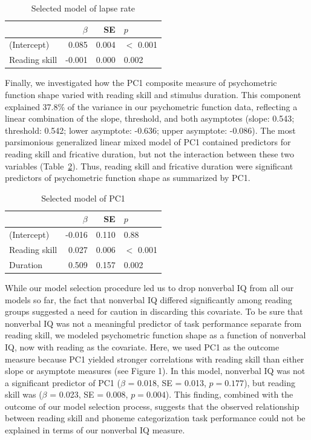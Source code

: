 \documentclass[../uwthesis.tex]{subfiles}
\begin{document}
\begin{table}
\centering
\caption{Selected model of lapse rate}
\label{tab:p2_lapse_model}
    \begin{tabular}{lrrl}
    \toprule
      & $\beta$ & SE & $p$\\
    \midrule
    (Intercept) & 0.085 & 0.004 & $<$ 0.001\\
    Reading skill & -0.001 & 0.000 & 0.002\\
    \bottomrule
    \end{tabular}
\end{table}

Finally, we investigated how the PC1 composite measure of psychometric function shape varied with reading skill and stimulus duration. This component explained 37.8\% of the variance in our psychometric function data, reflecting a linear combination of the slope, threshold, and both asymptotes (slope: 0.543; threshold: 0.542; lower asymptote: -0.636; upper asymptote: -0.086). The most parsimonious generalized linear mixed model of PC1 contained predictors for reading skill and fricative duration, but not the interaction between these two variables (Table~\ref{tab:p2_PC1}). Thus, reading skill and fricative duration were significant predictors of psychometric function shape as summarized by PC1. 

\begin{table}
\caption{Selected model of PC1}
\label{tab:p2_PC1}
\centering
    \begin{tabular}{lrrl}
    \toprule
      & $\beta$ & SE & $p$\\
    \midrule
    (Intercept) & -0.016 & 0.110 & 0.88\\
    Reading skill & 0.027 & 0.006 & $<$ 0.001\\
    Duration & 0.509 & 0.157 & 0.002\\
    \bottomrule
    \end{tabular}
\end{table}



While our model selection procedure led us to drop nonverbal IQ from all our models so far, the fact that nonverbal IQ differed significantly among reading groups suggested a need for caution in discarding this covariate. To be sure that nonverbal IQ was not a meaningful predictor of task performance separate from reading skill, we modeled psychometric function shape as a function of nonverbal IQ, now with reading as the covariate. Here, we used PC1 as the outcome measure because PC1 yielded stronger correlations with reading skill than either slope or asymptote measures (see Figure 1). In this model, nonverbal IQ was not a significant predictor of PC1 ($\beta$ = 0.018, SE = 0.013, $p = 0.177$), but reading skill was ($\beta$ = 0.023, SE = 0.008, $p = 0.004$). This finding, combined with the outcome of our model selection process, suggests that the observed relationship between reading skill and phoneme categorization task performance could not be explained in terms of our nonverbal IQ measure. 
 
\end{document}
